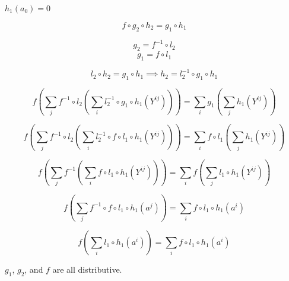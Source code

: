 \documentclass[sn-mathphys-num]{sn-jnl}%
\theoremstyle{thmstyleone}%
\theoremstyle{thmstyletwo}%
\theoremstyle{thmstylethree}%
\begin{document}
\begin{appendices}
$h_1 (a_0) = 0$

\begin{equation}
    f \circ g_2\circ h_2
    = g_1 \circ h_1
\end{equation}

\begin{equation}
    g_2 =  f^{-1} \circ l_2
\end{equation}
\begin{equation}
    g_1 =  f \circ l_1
\end{equation}

\begin{equation}
    l_2\circ h_2
    = g_1 \circ h_1
    \implies h_2
    = l_2^{-1} \circ g_1 \circ h_1
\end{equation}

\begin{equation}
    f \left( \sum_j f^{-1} \circ l_2 \left( \sum_i l_2^{-1} \circ g_1 \circ h_1(Y^{ij}) \right) \right)
    = \sum_i g_1\left( \sum_j h_1(Y^{ij}) \right)
\end{equation}

\begin{equation}
    f \left( \sum_j f^{-1} \circ l_2 \left( \sum_i l_2^{-1} \circ f \circ l_1 \circ h_1(Y^{ij}) \right) \right)
    = \sum_i f \circ l_1\left( \sum_j h_1(Y^{ij}) \right)
\end{equation}

\begin{equation}
    f \left( \sum_j f^{-1} \left( \sum_i f \circ l_1 \circ h_1(Y^{ij}) \right) \right)
    = \sum_i f \left( \sum_j l_1 \circ h_1(Y^{ij}) \right)
\end{equation}

\begin{equation}
    f \left( \sum_j f^{-1} \circ f \circ l_1 \circ h_1(a^{j}) \right)
    = \sum_i f \circ l_1 \circ h_1(a^{i})
\end{equation}

\begin{equation}
    f \left( \sum_i l_1 \circ h_1(a^{i}) \right)
    = \sum_i f \circ l_1 \circ h_1(a^{i})
\end{equation}


$g_1$, $g_2$, and $f$ are all distributive.




\end{appendices}


%
%
\end{document}
